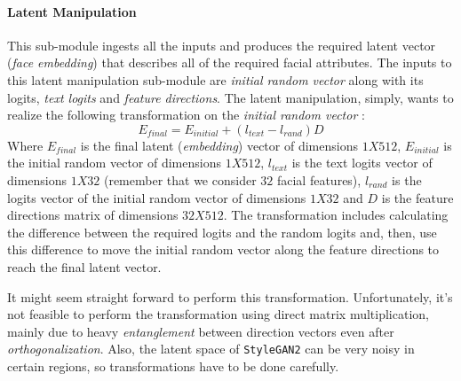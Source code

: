 \paragraph{Latent Manipulation}
This sub-module ingests all the inputs and produces the required latent vector (\emph{face embedding}) that describes all of the required facial attributes. The inputs to this latent manipulation sub-module are \emph{initial random vector} along with its logits, \emph{text logits} and \emph{feature directions}. The latent manipulation, simply, wants to realize the following transformation on the \emph{initial random vector} :
\begin{equation}
    E_{final} = E_{initial} + (l_{text} - l_{rand}) D
\end{equation}
Where $E_{final}$ is the final latent (\emph{embedding}) vector of dimensions $1X512$, $E_{initial}$ is the initial random vector of dimensions $1X512$, $l_{text}$ is the text logits vector of dimensions $1X32$ (remember that we consider $32$ facial features), $l_{rand}$ is the logits vector of the initial random vector of dimensions $1X32$ and $D$ is the feature directions matrix of dimensions $32X512$. The transformation includes calculating the difference between the required logits and the random logits and, then, use this difference to move the initial random vector along the feature directions to reach the final latent vector.

It might seem straight forward to perform this transformation. Unfortunately, it's not feasible to perform the transformation using direct matrix multiplication, mainly due to heavy \emph{entanglement} between direction vectors even after \emph{orthogonalization}. Also, the latent space of \texttt{StyleGAN2} can be very noisy in certain regions, so transformations have to be done carefully. 

